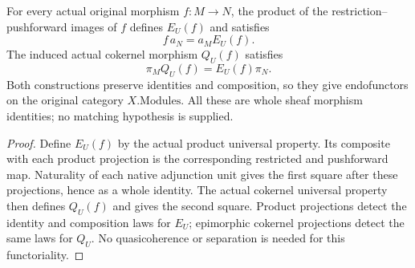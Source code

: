 \begin{theorem}
\label{thm:scheme-affine-effacement-naturality}
\leanok
{}
For every actual original morphism $f:M\to N$, the product of the
restriction--pushforward images of $f$ defines $E_U(f)$ and satisfies
\[
 f\,a_N=a_M E_U(f).
\]
The induced actual cokernel morphism $Q_U(f)$ satisfies
\[
 \pi_M Q_U(f)=E_U(f)\pi_N.
\]
Both constructions preserve identities and composition, so they give
endofunctors on the original category $X.\mathrm{Modules}$. All these
are whole sheaf morphism identities; no matching hypothesis is supplied.
\end{theorem}
\begin{proof}
Define $E_U(f)$ by the actual product universal property. Its composite
with each product projection is the corresponding restricted and
pushforward map. Naturality of each native adjunction unit gives the
first square after these projections, hence as a whole identity.
The actual cokernel universal property then defines $Q_U(f)$ and gives
the second square. Product projections detect the identity and
composition laws for $E_U$; epimorphic cokernel projections detect
the same laws for $Q_U$. No quasicoherence or separation is needed
for this functoriality.
\end{proof}
